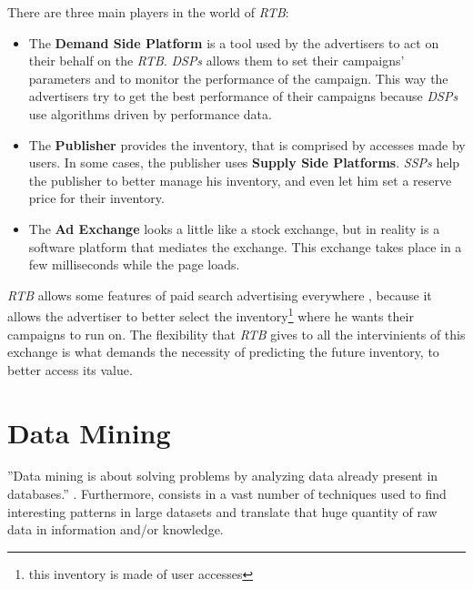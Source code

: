 There are three main players in the world of \emph{RTB}:
\begin{itemize}
\item The \textbf{Demand Side Platform} is a tool used by the advertisers to act on their behalf on the \emph{RTB}. \emph{DSPs} allows them to set
their campaigns' parameters and to monitor the performance of the campaign. This way the advertisers try to get the best performance of their campaigns because 
\emph{DSPs} use algorithms driven by performance data.\cite{Gern201230}
\item The \textbf{Publisher} provides the inventory, that is comprised by accesses made by users. In some cases, the publisher uses \textbf{Supply Side Platforms}.
\emph{SSPs} help the publisher to better manage his inventory, and even let him set a reserve price for their inventory.\cite{Yuan:2013:RBO:2501040.2501980}
\item The \textbf{Ad Exchange} looks a little like a stock exchange, but in reality is a software platform that mediates the exchange. This exchange takes place in
a few milliseconds while the page loads.
\end{itemize}

\emph{RTB} allows some features of paid search advertising everywhere \cite{Gern201230}, because it allows the advertiser to better select
the inventory\footnote{ this inventory is made of user accesses} where he wants their campaigns to run on.
The flexibility that \emph{RTB} gives to all the intervinients of this exchange is what demands the necessity of predicting the future inventory, to
better access its value.



\section{Data Mining}\label{sec:datamining}
''Data mining is about solving problems by analyzing data already present in databases.''\cite[p. 5]{Witten:2005:DMP:1205860}
. Furthermore, consists in a vast number of techniques used to find interesting patterns in large datasets and translate
that huge quantity of raw data in information and/or knowledge. 

